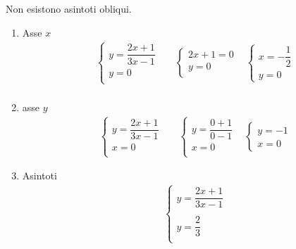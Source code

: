 \begin{exercise}
\begin{itemize}
\begin{enumerate}
		Non esistono asintoti obliqui.
	\end{enumerate}
	\begin{enumerate}
		\item Asse $x$
			\begin{align*}
		&\begin{cases}
		y=\dfrac{2x+1}{3x-1}\\
		y=0\\
		\end{cases}&
		&\begin{cases}
		2x+1=0\\
		y=0\\
		\end{cases}
		&\begin{cases}
		x=-\dfrac{1}{2}\\
		y=0
		\end{cases}\\
		\end{align*}
		\item asse $y$
			\begin{align*}
		&\begin{cases}
		y=\dfrac{2x+1}{3x-1}\\
		x=0\\
		\end{cases}&
		&\begin{cases}
		y=\dfrac{0+1}{0-1}\\
		x=0\\
		\end{cases}
		&\begin{cases}
		y=-1\\
		x=0
		\end{cases}
		\end{align*}
		\item Asintoti
			\begin{align*}
		&\begin{cases}
		y=\dfrac{2x+1}{3x-1}\\
		\\
		y=\dfrac{2}{3}\\
		\end{cases}
		\end{align*}
		

\end{enumerate}
\end{itemize}
\end{exercise}
